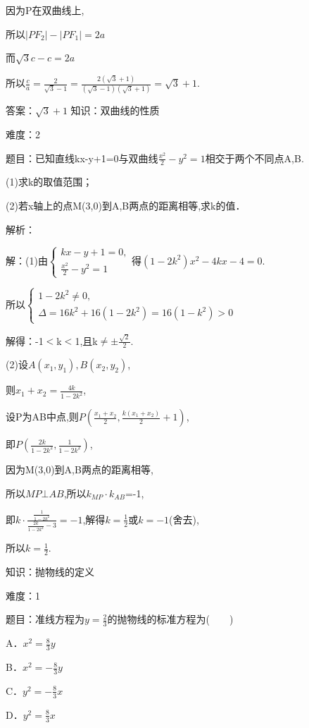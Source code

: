 \documentclass{article} %
\begin{document}
因为P在双曲线上,

所以$|PF_2|-|PF_1|=2a$

而$\sqrt{3}c-c=2a$

所以$\frac{c}{a}=\frac{2}{\sqrt{3}-1}=\frac{2(\sqrt{3}+1)}{(\sqrt{3}-1)(\sqrt{3}+1)}=\sqrt{3}+1$.

答案：$\sqrt{3}+1$
知识：双曲线的性质

难度：2

题目：已知直线kx-y+1=0与双曲线$\frac{x^2}{2}-y^{2}=1$相交于两个不同点A,B.

(1)求k的取值范围；

(2)若x轴上的点M(3,0)到A,B两点的距离相等,求k的值．

解析：

解：(1)由$\left\{
\begin{array}{l}
kx-y+1=0, \\
\frac{x^2}{2}-y^2=1
\end{array}
\right.$得$(1-2k^{2})x^{2}-4kx-4=0$.

所以$\left\{
\begin{array}{l}
1-2k^2\ne 0, \\
\Delta =16k^2+16(1-2k^2)=16(1-k^2)>0
\end{array}
\right.$

解得：-1${<}$k${<}$1,且k${\neq}$${\pm}\frac{\sqrt{2}}{2}$.

(2)设$A(x_{1},y_{1}),B(x_{2},y_{2})$,

则$x_{1}+x_{2}=\frac{4k}{1-2k^2}$,

设P为AB中点,则$P(\frac{x_1+x_2}{2},\frac{k(x_1+x_2)}{2}+1)$,

即$P(\frac{2k}{1-2k^2},\frac{1}{1-2k^2})$,

因为M(3,0)到A,B两点的距离相等,

所以$MP{\bot}AB$,所以$k_{MP}\cdot k_{AB}$=-1,

即$k\cdot \frac{\frac{1}{1-2k^2}}{\frac{2k}{1-2k^2}-3}=-1$,解得$k=\frac{1}{2}$或$k=-1$(舍去),

所以$k=\frac{1}{2}$.



知识：抛物线的定义

难度：1

题目：准线方程为$y=\frac{2}{3}$的抛物线的标准方程为(　　)

A．$x^{2}=\frac{8}{3}y$   

B．$x^{2}=-\frac{8}{3}y$

C．$y^{2}=-\frac{8}{3}x$   

D．$y^{2}=\frac{8}{3}x$
\end{document}
